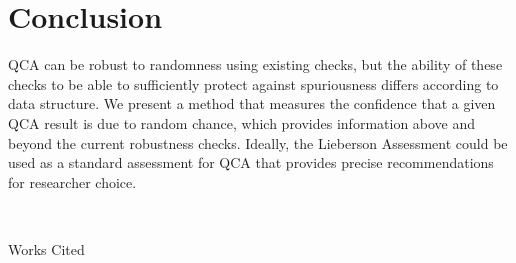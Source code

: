 \documentclass[]{article}
\begin{document}


\section{Conclusion}

QCA can be robust to randomness using existing checks, but the ability of these checks to be able to sufficiently protect against spuriousness differs according to data structure. We present a method that measures the confidence that a given QCA result is due to random chance, which provides information above and beyond the current robustness checks. Ideally, the Lieberson Assessment could be used as a standard assessment for QCA that provides precise recommendations for researcher choice. 


\
\begin{center}
Works Cited
\end{center}









\end{document}
